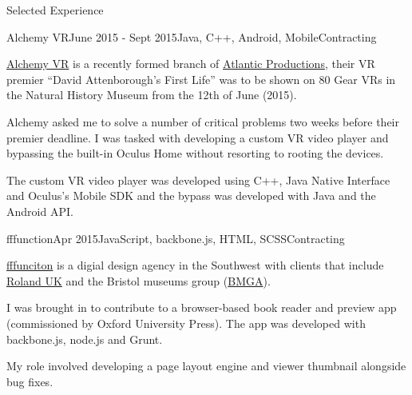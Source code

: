 \documentclass{resume} %
\begin{document}
\begin{rSection}{Selected Experience}
\begin{rSubsection}{Alchemy VR}{June 2015 - Sept 2015}{Java, C++, Android, Mobile}{Contracting}
\item \href{http://www.alchemyvr.com/}{Alchemy VR} is a recently formed branch of \href{http://www.atlanticproductions.tv/}{Atlantic Productions}, their VR premier ``David Attenborough's First Life'' was to be shown on 80 Gear VRs in the Natural History Museum from the 12th of June (2015).
\item Alchemy asked me to solve a number of critical problems two weeks before their premier deadline. I was tasked with developing a custom VR video player and bypassing the built-in Oculus Home without resorting to rooting the devices.
\item The custom VR video player was developed using C++, Java Native Interface and Oculus's Mobile SDK and the bypass was developed with Java and the Android API.
\end{rSubsection}


\begin{rSubsection}{fffunction}{Apr 2015}{JavaScript, backbone.js, HTML, SCSS}{Contracting}
\item \href{http://fffunction.co/}{fffunciton} is a digial design agency in the Southwest with clients that include \href{http://www.roland.co.uk}{Roland UK} and the Bristol museums group (\href{http://bristolmuseums.org.uk}{BMGA}).
\item I was brought in to contribute to a browser-based book reader and preview app (commissioned by Oxford University Press). The app was developed with backbone.js, node.js and Grunt. 
\item My role involved developing a page layout engine and viewer thumbnail alongside bug fixes.
\end{rSubsection}



\end{rSection}
\end{document}
